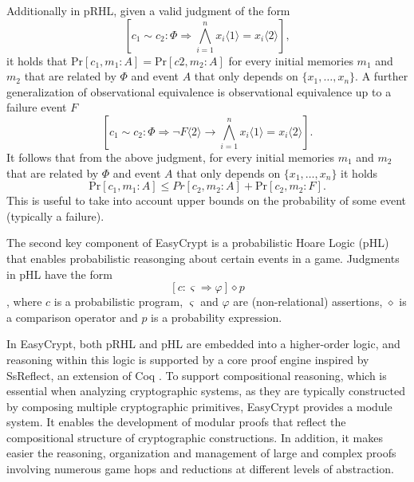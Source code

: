 Additionally in pRHL, given a valid judgment of the form
\[
\left[ c_1 \sim c_2: \Phi \Longrightarrow \bigwedge\limits_{i=1}^n x_i\langle1\rangle = x_i\langle2\rangle \right],
\]
it holds that $\mathrm{Pr}[c_1, m_1: A] = \mathrm{Pr}[c2, m_2: A]$ for every initial memories $m_1$ and $m_2$ that are related by $\Phi$ and event $A$ that only depends on $\{x_1, \dots , x_n\}$. A further generalization of observational equivalence is observational equivalence up to a
failure event $F$
\[
\left[ c_1 \sim c_2: \Phi \Longrightarrow \neg F\langle2\rangle \to \bigwedge\limits_{i=1}^n x_i\langle1\rangle = x_i\langle2\rangle \right].
\]
It follows that from the above judgment, for every initial memories $m_1$ and $m_2$ that are related by $\Phi$ and event $A$ that only depends on $\{x_1, \dots , x_n\}$ it holds
\[
\mathrm{Pr}[c_1, m_1: A] \leq Pr [c_2, m_2 : A] + \mathrm{Pr}[c_2, m_2 : F].
\]
This is useful to take into account upper bounds on the probability of some event (typically a failure).

The second key component of EasyCrypt is a probabilistic Hoare Logic (pHL) that enables probabilistic reasonging about certain events in a game. Judgments in pHL have the form
\[ 
[c : \varsigma \Longrightarrow \varphi] \diamond p \],
where $c$ is a probabilistic program, $\varsigma$ and $\varphi$ are (non-relational) assertions, $\diamond$ is a comparison operator and $p$ is a probability expression.

In EasyCrypt, both pRHL and pHL are embedded into a higher-order logic, and reasoning within this logic is supported by a core proof engine inspired by SsReflect, an extension of Coq \cite{ssreflect-coq}. To support compositional reasoning, which is essential when analyzing cryptographic systems, as they are typically constructed by composing multiple cryptographic primitives, EasyCrypt provides a module system. It enables the development of modular proofs that reflect the compositional structure of cryptographic constructions. In addition, it makes easier the reasoning, organization and management of large and complex proofs involving numerous game hops and reductions at different levels of abstraction.

